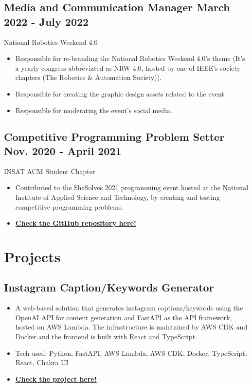 \documentclass[a4,10pt]{article}
\newcommand{\subtext}[1]{
#1\par\vspace{-0.2cm}}
\newenvironment{zitemize}{
\begin{itemize}\itemsep0pt \parskip0pt \parsep1pt}
{\end{itemize}\vspace{-0.5cm}}
\begin{document}
\subsection*{Media and Communication Manager \hfill March 2022 - July 2022} 
\subtext{National Robotics Weekend 4.0\hfill } 
    \begin{zitemize}
        \item Responsible for re-branding the National Robotics Weekend 4.0's theme (It's a yearly congress abbreviated as NRW 4.0, hosted by one of IEEE's society chapters (The Robotics & Automation Society)).
        \item Responsible for creating the graphic design assets related to the event.
        \item Responsible for moderating the event's social media.
    \end{zitemize}

\subsection*{Competitive Programming Problem Setter \hfill Nov. 2020 - April 2021} 
\subtext{INSAT ACM Student Chapter \hfill } 
    \begin{zitemize}
        \item  Contributed to the SheSolves 2021 programming event hosted at the National Institute of Applied Science and Technology, by creating and testing competitive programming problems.
         \item \href{https://github.com/sirajeddineaissa/SheSolves2021-INSAT}{\small \textbf {Check the GitHub repository here!}}
    \end{zitemize}
  


\section{Projects} 

\subsection*{Instagram Caption/Keywords Generator {\normalsize\normalfont} \hfill} 
    \begin{zitemize}
        \item A web-based solution that generates instagram captions/keywords using the OpenAI API for content generation and FastAPI as the API framework, hosted on AWS Lambda. The infrastructure is maintained by AWS CDK and Docker and the frontend is built with React and TypeScript.
        \item Tech used: Python, FastAPI, AWS Lambda, AWS CDK, Docker, TypeScript, React, Chakra UI
         \item \href{https://aws-openai-instagram-gen.vercel.app}{\small \textbf {Check the project here!}}
    \end{zitemize}
    
\end{document}
